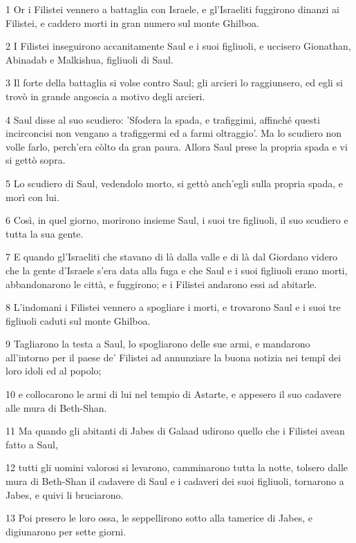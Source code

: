 \par 1 Or i Filistei vennero a battaglia con Israele, e gl'Israeliti fuggirono dinanzi ai Filistei, e caddero morti in gran numero sul monte Ghilboa.
\par 2 I Filistei inseguirono accanitamente Saul e i suoi figliuoli, e uccisero Gionathan, Abinadab e Malkishua, figliuoli di Saul.
\par 3 Il forte della battaglia si volse contro Saul; gli arcieri lo raggiunsero, ed egli si trovò in grande angoscia a motivo degli arcieri.
\par 4 Saul disse al suo scudiero: 'Sfodera la spada, e trafiggimi, affinché questi incirconcisi non vengano a trafiggermi ed a farmi oltraggio'. Ma lo scudiero non volle farlo, perch'era còlto da gran paura. Allora Saul prese la propria spada e vi si gettò sopra.
\par 5 Lo scudiero di Saul, vedendolo morto, si gettò anch'egli sulla propria spada, e morì con lui.
\par 6 Così, in quel giorno, morirono insieme Saul, i suoi tre figliuoli, il suo scudiero e tutta la sua gente.
\par 7 E quando gl'Israeliti che stavano di là dalla valle e di là dal Giordano videro che la gente d'Israele s'era data alla fuga e che Saul e i suoi figliuoli erano morti, abbandonarono le città, e fuggirono; e i Filistei andarono essi ad abitarle.
\par 8 L'indomani i Filistei vennero a spogliare i morti, e trovarono Saul e i suoi tre figliuoli caduti sul monte Ghilboa.
\par 9 Tagliarono la testa a Saul, lo spogliarono delle sue armi, e mandarono all'intorno per il paese de' Filistei ad annunziare la buona notizia nei tempî dei loro idoli ed al popolo;
\par 10 e collocarono le armi di lui nel tempio di Astarte, e appesero il suo cadavere alle mura di Beth-Shan.
\par 11 Ma quando gli abitanti di Jabes di Galaad udirono quello che i Filistei avean fatto a Saul,
\par 12 tutti gli uomini valorosi si levarono, camminarono tutta la notte, tolsero dalle mura di Beth-Shan il cadavere di Saul e i cadaveri dei suoi figliuoli, tornarono a Jabes, e quivi li bruciarono.
\par 13 Poi presero le loro ossa, le seppellirono sotto alla tamerice di Jabes, e digiunarono per sette giorni.


